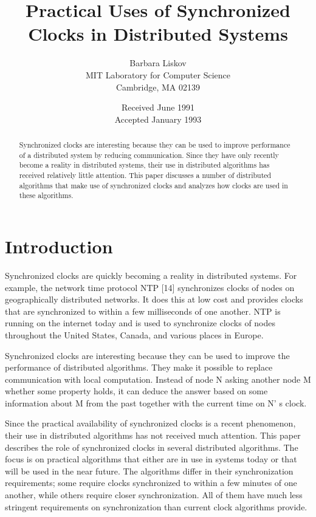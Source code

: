 \documentclass[a4paper,11pt,notitlepage,twoside,openright]{article}
\title{Practical Uses of Synchronized Clocks in Distributed Systems}
\author{Barbara Liskov\\%
MIT Laboratory for Computer Science\\
Cambridge, MA 02139%
}
\date{%
Received June 1991\\
Accepted January 1993%
}
\begin{document}
\maketitle

\begin{abstract}
  Synchronized clocks are interesting because they can be used to improve
  performance of a distributed system by reducing communication. Since
  they have only recently become a reality in distributed systems, their
  use in distributed algorithms has received relatively little attention.
  This paper discusses a number of distributed algorithms that make use of
  synchronized clocks and analyzes how clocks are used in these
  algorithms.
\end{abstract}

\hypertarget{introduction}{%
\section{Introduction}\label{introduction}}

Synchronized clocks are quickly becoming a reality in distributed
systems. For example, the network time protocol NTP {[}14{]} synchronizes
clocks of nodes on geographically distributed networks. It does this at
low cost and provides clocks that are synchronized to within a few
milliseconds of one another. NTP is running on the internet today and is
used to synchronize clocks of nodes throughout the United States,
Canada, and various places in Europe.

Synchronized clocks are interesting because they can be used to improve
the performance of distributed algorithms. They make it possible to
replace communication with local computation. Instead of node N asking
another node M whether some property holds, it can deduce the answer
based on some information about M from the past together with the
current time on N' s clock.

Since the practical availability of synchronized clocks is a recent
phenomenon, their use in distributed algorithms has not received much
attention. This paper describes the role of synchronized clocks in
several distributed algorithms. The focus is on practical algorithms
that either are in use in systems today or that will be used in the near
future. The algorithms differ in their synchronization requirements;
some require clocks synchronized to within a few minutes of one another,
while others require closer synchronization. All of them have much less
stringent requirements on synchronization than current clock algorithms
provide.
\end{document}
